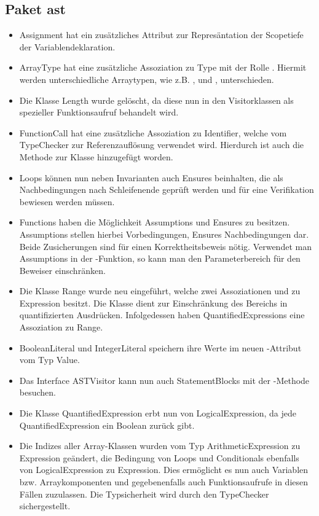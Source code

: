 \subsection{Paket ast}
\begin{itemize}
  \item Assignment hat ein zus\"{a}tzliches Attribut  zur Repres\"{a}ntation der Scopetiefe der Variablendeklaration.
  \item ArrayType hat eine zus\"{a}tzliche Assoziation zu Type mit der Rolle . Hiermit werden unterschiedliche Arraytypen, wie z.B. ,  und , unterschieden.
  \item Die Klasse Length wurde gel\"{o}scht, da diese nun in den Visitorklassen als spezieller Funktionsaufruf behandelt wird.
  \item FunctionCall hat eine zus\"{a}tzliche Assoziation zu Identifier, welche vom TypeChecker zur Referenzaufl\"{o}sung verwendet wird. Hierdurch ist auch die Methode  zur Klasse hinzugef\"{u}gt worden.
  \item Loops k\"{o}nnen nun neben Invarianten auch Ensures beinhalten, die als Nachbedingungen nach Schleifenende gepr\"{u}ft werden und f\"{u}r eine Verifikation bewiesen werden m\"{u}ssen.
  \item Functions haben die M\"{o}glichkeit Assumptions und Ensures zu besitzen. Assumptions stellen hierbei Vorbedingungen, Ensures Nachbedingungen dar. Beide Zusicherungen sind f\"{u}r einen Korrektheitsbeweis n\"{o}tig. Verwendet man Assumptions in der -Funktion, so kann man den Parameterbereich f\"{u}r den Beweiser einschr\"{a}nken.
  \item Die Klasse Range wurde neu eingef\"{u}hrt, welche zwei Assoziationen  und  zu Expression besitzt. Die Klasse dient zur Einschr\"{a}nkung des Bereichs in quantifizierten Ausdr\"{u}cken. Infolgedessen haben QuantifiedExpressions eine Assoziation zu Range.
  \item BooleanLiteral und IntegerLiteral speichern ihre Werte im neuen -Attribut vom Typ Value.
  \item Das Interface ASTVisitor kann nun auch StatementBlocks mit der -Methode besuchen.
  \item Die Klasse QuantifiedExpression erbt nun von LogicalExpression, da jede QuantifiedExpression ein Boolean zur\"{u}ck gibt.
  \item Die Indizes aller Array-Klassen wurden vom Typ ArithmeticExpression zu Expression ge\"{a}ndert, die Bedingung von Loops und Conditionals ebenfalls von LogicalExpression zu Expression. Dies erm\"{o}glicht es nun auch Variablen bzw. Arraykomponenten und gegebenenfalls auch Funktionsaufrufe in diesen F\"{a}llen zuzulassen. Die Typsicherheit wird durch den TypeChecker sichergestellt.

\end{itemize}
